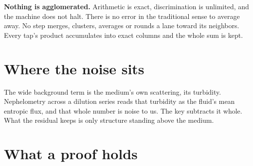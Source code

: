 \textbf{Nothing is agglomerated.} Arithmetic is exact, discrimination is unlimited, and the machine does not halt. There is no error in the traditional sense to average away. No step merges, clusters, averages or rounds a lane toward its neighbors. Every tap's product accumulates into exact columns and the whole sum is kept.

\section{\texorpdfstring{Where the noise sits}{Where the noise sits}}

The wide background term is the medium's own scattering, its turbidity. Nephelometry across a dilution series reads that turbidity as the fluid's mean entropic flux, and that whole number is noise to us. The key subtracts it whole. What the residual keeps is only structure standing above the medium.

\section{\texorpdfstring{What a proof holds}{What a proof holds}}

